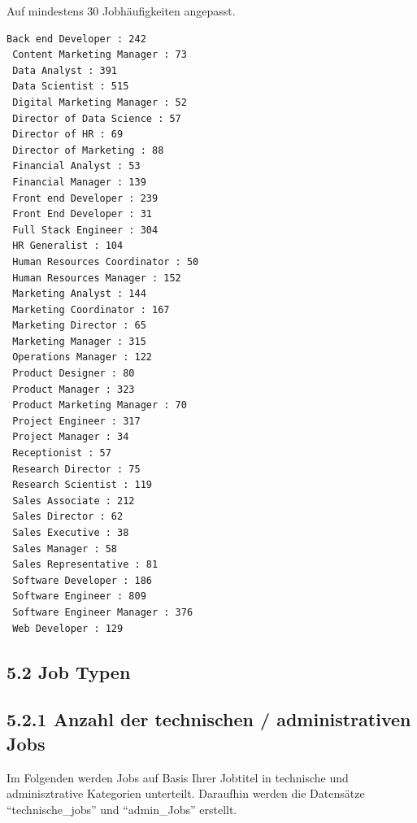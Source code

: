 \documentclass[
  letterpaper,
  DIV=11,
  numbers=noendperiod]{scrartcl}
\newenvironment{Shaded}{\begin{snugshade}}{\end{snugshade}}
\newcommand{\FunctionTok}[1]{\textcolor[rgb]{0.28,0.35,0.67}{#1}}
\newcommand{\NormalTok}[1]{\textcolor[rgb]{0.00,0.23,0.31}{#1}}
\newcommand{\OtherTok}[1]{\textcolor[rgb]{0.00,0.23,0.31}{#1}}
\newcommand{\SpecialCharTok}[1]{\textcolor[rgb]{0.37,0.37,0.37}{#1}}
\newcommand{\StringTok}[1]{\textcolor[rgb]{0.13,0.47,0.30}{#1}}
\begin{document}
Auf mindestens 30 Jobhäufigkeiten angepasst.

\begin{Shaded}
\end{Shaded}

\begin{verbatim}
Back end Developer : 242 
 Content Marketing Manager : 73 
 Data Analyst : 391 
 Data Scientist : 515 
 Digital Marketing Manager : 52 
 Director of Data Science : 57 
 Director of HR : 69 
 Director of Marketing : 88 
 Financial Analyst : 53 
 Financial Manager : 139 
 Front end Developer : 239 
 Front End Developer : 31 
 Full Stack Engineer : 304 
 HR Generalist : 104 
 Human Resources Coordinator : 50 
 Human Resources Manager : 152 
 Marketing Analyst : 144 
 Marketing Coordinator : 167 
 Marketing Director : 65 
 Marketing Manager : 315 
 Operations Manager : 122 
 Product Designer : 80 
 Product Manager : 323 
 Product Marketing Manager : 70 
 Project Engineer : 317 
 Project Manager : 34 
 Receptionist : 57 
 Research Director : 75 
 Research Scientist : 119 
 Sales Associate : 212 
 Sales Director : 62 
 Sales Executive : 38 
 Sales Manager : 58 
 Sales Representative : 81 
 Software Developer : 186 
 Software Engineer : 809 
 Software Engineer Manager : 376 
 Web Developer : 129 
\end{verbatim}

\hypertarget{job-typen}{%
\subsection{5.2 Job Typen}\label{job-typen}}

\hypertarget{anzahl-der-technischen-administrativen-jobs}{%
\subsection{5.2.1 Anzahl der technischen / administrativen
Jobs}\label{anzahl-der-technischen-administrativen-jobs}}

Im Folgenden werden Jobs auf Basis Ihrer Jobtitel in technische und
adminisztrative Kategorien unterteilt. Daraufhin werden die Datensätze
``technische\_jobs'' und ``admin\_Jobs'' erstellt.
\end{document}
